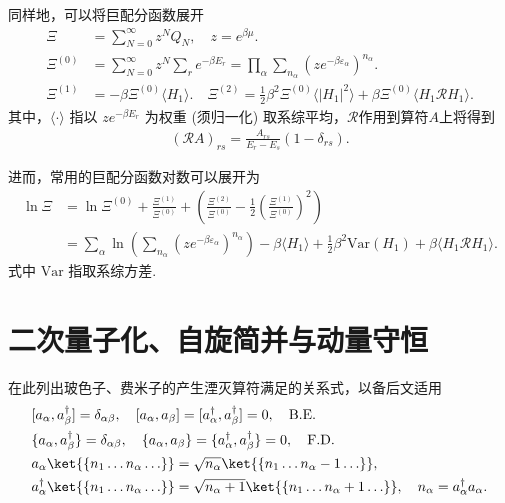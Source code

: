 同样地，可以将巨配分函数展开
\begin{align*}
	\Xi &= \sum_{N=0}^{\infty} z^{N} Q_{N}, \quad z = e^{\beta\mu}.\\
	\Xi^{(0)} &= \sum_{N=0}^{\infty} z^{N} \sum_{r} e^{-\beta E_{r}} = \prod_{\alpha} \sum_{n_{\alpha}} \left( z e^{-\beta \varepsilon_{\alpha}} \right)^{n_{\alpha}}. \\
	\Xi^{(1)} &= -\beta \Xi^{(0)} \langle H_{1} \rangle. \quad
	\Xi^{(2)} = \frac{1}{2} \beta^{2} \Xi^{(0)} \langle |H_{1}|^{2} \rangle + \beta \Xi^{(0)} \langle H_{1} \mathcal{R} H_{1} \rangle.
\end{align*}
其中，\(\langle \cdot \rangle\) 指以 \(z e^{-\beta E_{r}}\) 为权重 (须归一化) 取系综平均，\(\mathcal{R}\)作用到算符\(A\)上将得到
\begin{align*}
	(\mathcal{R} A)_{rs} = \frac{A_{rs}}{E_{r} - E_{s}} (1 - \delta_{rs}).
\end{align*}

进而，常用的巨配分函数对数可以展开为
\begin{align*}
	\ln \Xi &= \ln \Xi^{(0)} + \frac{\Xi^{(1)}}{\Xi^{(0)}} + \left( \frac{\Xi^{(2)}}{\Xi^{(0)}} - \frac{1}{2} \left( \frac{\Xi^{(1)}}{\Xi^{(0)}} \right)^{2} \right) \\
	&= \sum_{\alpha} \ln \left( \sum_{n_{\alpha}} \left( z e^{-\beta \varepsilon_{\alpha}} \right)^{n_{\alpha}} \right) - \beta \langle H_{1} \rangle + \frac{1}{2} \beta^{2} \mathrm{Var}(H_{1}) + \beta \langle H_{1} \mathcal{R} H_{1} \rangle.
\end{align*}
式中 \(\mathrm{Var}\) 指取系综方差.

\section{二次量子化、自旋简并与动量守恒}

在此列出玻色子、费米子的产生湮灭算符满足的关系式，以备后文适用
\begin{align*}
	&[a_{\alpha}, a_{\beta}^{\dagger}] = \delta_{\alpha\beta}, \quad [a_{\alpha}, a_{\beta}] = [a_{\alpha}^{\dagger}, a_{\beta}^{\dagger}] = 0, \quad \text{B.E.} \\
	&\{a_{\alpha}, a_{\beta}^{\dagger}\} = \delta_{\alpha\beta}, \quad \{a_{\alpha}, a_{\beta}\} = \{a_{\alpha}^{\dagger}, a_{\beta}^{\dagger}\} = 0, \quad \text{F.D.} \\
	&a_{\alpha} \ket{\{n_{1} \ldots n_{\alpha} \ldots\}} = \sqrt{n_{\alpha}} \ket{\{n_{1} \ldots n_{\alpha} - 1 \ldots\}}, \\
	&a_{\alpha}^{\dagger} \ket{\{n_{1} \ldots n_{\alpha} \ldots\}} = \sqrt{n_{\alpha} + 1} \ket{\{n_{1} \ldots n_{\alpha} + 1 \ldots\}}, \quad
	n_{\alpha} = a_{\alpha}^{\dagger} a_{\alpha}.
\end{align*}


